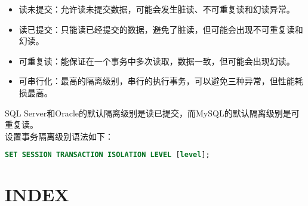 \documentclass[12pt, openany, oneside]{book}
\begin{document}
\begin{table}[H]
	\centering
	\caption{隔离级别}
\end{table}

\begin{itemize}
	\item 读未提交：允许读未提交数据，可能会发生脏读、不可重复读和幻读异常。

	\item 读已提交：只能读已经提交的数据，避免了脏读，但可能会出现不可重复读和幻读。

	\item 可重复读：能保证在一个事务中多次读取，数据一致，但可能会出现幻读。

	\item 可串行化：最高的隔离级别，串行的执行事务，可以避免三种异常，但性能耗损最高。
\end{itemize}

SQL Server和Oracle的默认隔离级别是读已提交，而MySQL的默认隔离级别是可重复读。\\

设置事务隔离级别语法如下：

\vspace{-0.5cm}

\begin{lstlisting}[language=SQL]
SET SESSION TRANSACTION ISOLATION LEVEL [level];
\end{lstlisting}

\newpage

\chapter{INDEX}

\vspace{0.5cm}
\end{document}

